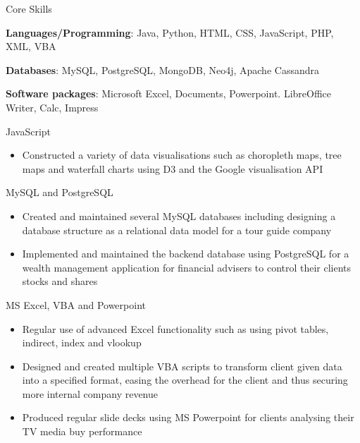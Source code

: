 \begin{cventries}
  \cventry
    {Core Skills}
    {}
    {}
    {}
    {
      \begin{cvitems}
        \item {\textbf{Languages/Programming}: Java, Python, HTML, CSS, JavaScript, PHP, XML, VBA}
        \item {\textbf{Databases}: MySQL, PostgreSQL, MongoDB, Neo4j, Apache Cassandra}
        \item {\textbf{Software packages}: Microsoft Excel, Documents, Powerpoint. LibreOffice Writer, Calc, Impress}
        \item {JavaScript}
        \vspace{1mm}
        \begin{itemize}
        \item {Constructed a variety of data visualisations such as choropleth maps, tree maps and waterfall charts using D3 and the Google visualisation API}
        \end{itemize}
        \item {MySQL and PostgreSQL}
        \vspace{1mm}
        \begin{itemize}
        \item {Created and maintained several MySQL databases including designing a database structure as a relational
        data model for a tour guide company}                             \vspace{.5mm}
        \item {Implemented and maintained the backend database using PostgreSQL for a wealth management application for financial advisers to control their clients stocks and shares}
        \end{itemize}
        \item {MS Excel, VBA and Powerpoint}
        \vspace{1mm}
        \begin{itemize}
        \item {Regular use of advanced Excel functionality such as using pivot tables, indirect, index and vlookup}                          \vspace{.5mm}
        \item {Designed and created multiple VBA scripts to transform client given data into a specified format, easing the overhead 
              for the client and thus securing more internal company revenue}                            \vspace{.5mm}
        \item {Produced regular slide decks using MS Powerpoint for clients analysing their TV media buy performance}
        \end{itemize}
        \end{cvitems}
    }
\end{cventries}